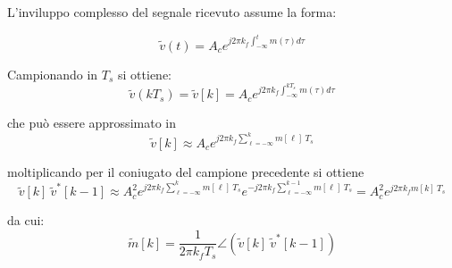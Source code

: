 L'inviluppo complesso del segnale ricevuto assume la forma:

\[
    \tilde{v}(t) = A_c e^{j2\pi k_f \int_{-\infty}^{t} m(\tau) d\tau}
\]

Campionando in $T_s$ si ottiene:
\[
    \tilde{v}(kT_s) = \tilde{v}[k] = A_c e^{j2\pi k_f \int_{-\infty}^{kT_s} m(\tau) d\tau}
\]

che può essere approssimato in
\[
    \tilde{v}[k] \approx A_c e^{j2\pi k_f \sum_{\ell = -\infty}^{k} m[\ell] \ T_s}
\]

moltiplicando per il coniugato del campione precedente si ottiene
\[
    \tilde{v}[k] \ \tilde{v}^*[k-1] \approx A_c^2 e^{j2\pi k_f \sum_{\ell = -\infty}^{k} m[\ell] \ T_s} e^{-j2\pi k_f \sum_{\ell = -\infty}^{k-1} m[\ell] \ T_s} = A_c^2 e^{j2\pi k_f m[k] \ T_s}
\]

da cui:
\[
    \tilde{m}[k] = \frac{1}{2\pi k_f T_s} \angle \left( \tilde{v}[k] \ \tilde{v}^*[k-1] \right)
\]



